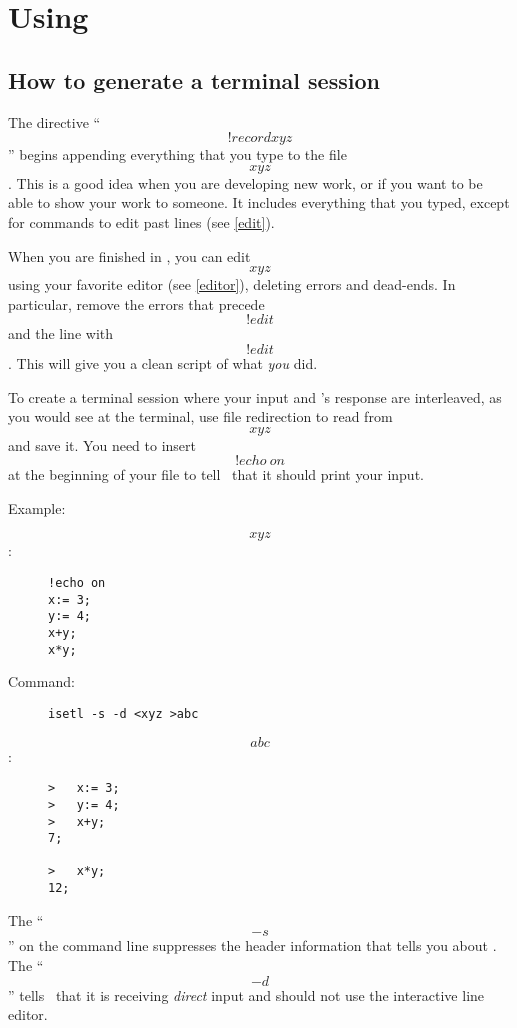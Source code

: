 \section{Using \ISETL}\label{usage}

\subsection{How to generate a terminal session}\label{script}\label{echo}
    The directive ``\[!record xyz\]'' begins appending everything that you
    type to the file \[xyz\].  This is a good idea when you are developing
    new work, or if you want to be able to show your work to someone.
    It includes everything that you typed, except for commands to edit
    past lines (see \ref{edit}).  

    When you are finished in \ISETL, you can edit \[xyz\] using your
    favorite editor (see \ref{editor}), deleting errors and dead-ends.
    In particular, remove the errors that precede \[!edit\] and the line
    with \[!edit\].  This will give you a clean script of what {\em you\/}
    did.  

    To create a terminal session where your input and \ISETL's response are
    interleaved, as you would see at the terminal, use file redirection to
    read from \[xyz\] and save it.  You need to insert \[!echo~on\] at the
    beginning of your file to tell \ISETL\ that it should print your
    input.

    \pagebreak[1]
    Example:
    \begin{description}
    \item[\[xyz\]:]
	\begin{verbatim}
!echo on
x:= 3;
y:= 4;
x+y;
x*y;
	\end{verbatim}

    \pagebreak[1]
    \item[Command:]
	\begin{verbatim}
isetl -s -d <xyz >abc
	\end{verbatim}

    \pagebreak[1]
    \item[\[abc\]:]
	\begin{verbatim}
>	x:= 3;
>	y:= 4;
>	x+y;
7;

>	x*y;
12;
	\end{verbatim}
    \end{description}

    The ``\[-s\]'' on the command line suppresses the header information
    that tells you about \ISETL\@.
    The ``\[-d\]'' tells \ISETL\ that it is receiving {\em direct\/}
    input and should not use the interactive line editor.


